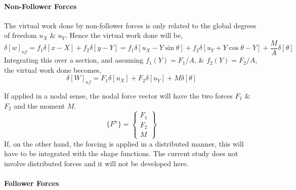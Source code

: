 \documentclass[10pt]{article}
\begin{document}
\paragraph{Non-Follower Forces}
The virtual work done by non-follower forces is only related to the
global degrees of freedom $u_X$ \& $u_Y$. Hence the virtual work done
will be,
\begin{equation}
  \delta[w]_{nf} = f_1\delta[x-X] + f_2\delta[y-Y] =
  f_1\delta[u_X-Y\sin\theta] + f_2\delta[u_Y+Y\cos\theta-Y] + \frac{M}{A}\delta[\theta]
  \label{eq:nflw}
\end{equation}
Integrating this over a section, and assuming
$f_1(Y)=F_1/A$,
\& $f_2(Y)=F_2/A$, the virtual work done becomes,
\begin{equation}
  \delta[W]_{nf} = F_1\delta[u_X] + F_2\delta[u_Y] + M\delta[\theta]
  \label{eq:nflvwrk}  
\end{equation}

If applied in a nodal sense, the nodal force vector will have the two
forces $F_1$ \& $F_2$ and the moment $M$.
$$ \{F^n\} = \begin{Bmatrix} F_1\\F_2\\M \end{Bmatrix} $$
If, on the other hand, the forcing is applied in a distributed manner,
this will have to be integrated with the shape functions. The current
study does not involve distributed forces and it will not be developed
here.

\paragraph{Follower Forces}
\end{document}
